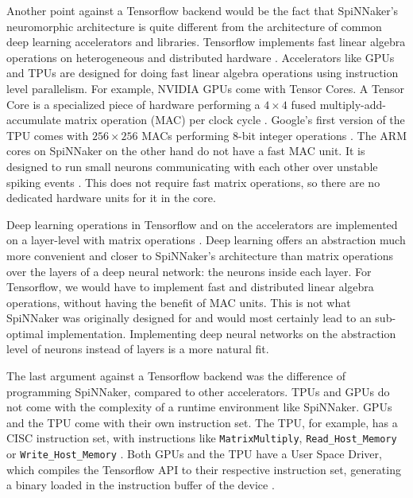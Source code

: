 \documentclass{article}
\begin{document}
Another point against a Tensorflow backend would be
the fact that SpiNNaker's neuromorphic architecture is
quite different from the architecture of common deep
learning accelerators and libraries.
Tensorflow implements fast linear algebra operations on
heterogeneous and distributed hardware \citep{tf2015}.
Accelerators like GPUs and TPUs are designed for doing
fast linear algebra operations using instruction level parallelism.
For example, NVIDIA GPUs come with Tensor Cores.
A Tensor Core is a specialized piece of hardware performing a
$4\times4$ fused multiply-add-accumulate matrix operation (MAC) per
clock cycle \citep{markidis_et_al_2018}.
Google's first version of the TPU comes with $256\times256$ MACs
performing 8-bit integer operations \citep{tpus}.
The ARM cores on SpiNNaker on the other hand do not have a fast MAC
unit.
It is designed to run small neurons communicating with each other over
unstable spiking events \citep{furber_et_al_2007}.
This does not require fast matrix operations, so there are no
dedicated hardware units for it in the core.

Deep learning operations in Tensorflow and on the accelerators are
implemented on a layer-level with matrix operations
\citep{goodfellow2016}.
Deep learning offers an abstraction much more convenient
and closer to SpiNNaker's architecture than matrix
operations over the layers of a deep neural network: the
neurons inside each layer.
For Tensorflow, we would have to implement fast and
distributed linear algebra operations, without having the benefit
of MAC units.
This is not what SpiNNaker was originally designed for and would
most certainly lead to an sub-optimal implementation.
Implementing deep neural networks on the abstraction level of neurons
instead of layers is a more natural fit.

The last argument against a Tensorflow backend was the difference of
programming SpiNNaker, compared to other accelerators.
TPUs and GPUs do not come with the complexity of a runtime environment
like SpiNNaker.
GPUs and the TPU come with their own instruction set.
The TPU, for example, has a CISC instruction set, with instructions
like \texttt{MatrixMultiply}, \texttt{Read\_Host\_Memory} or
\texttt{Write\_Host\_Memory} \citep{tpus}.
Both GPUs and the TPU have a User Space Driver, which compiles the
Tensorflow API to their respective instruction set, generating a
binary loaded in the instruction buffer of the device \citep{tpus}.
\end{document}
